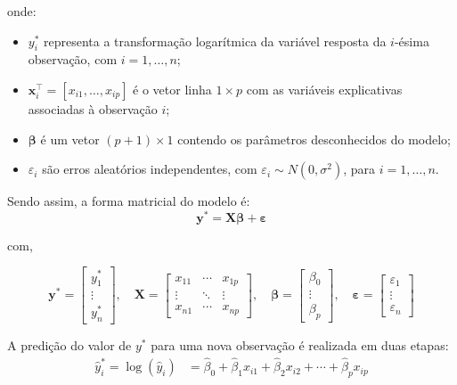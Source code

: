 \documentclass[12pt,a4paper,header]{abnt}
\begin{document}
onde:

\begin{itemize}
    \item \( y_i^* \) representa a transformação logarítmica da variável resposta da \(i\)-ésima observação, com $i = 1,\ldots,n$;
    \item \( \mathbf{x}_i^\top = [x_{i1}, \ldots, x_{ip}] \) é o vetor linha \( 1 \times p \) com as variáveis explicativas associadas à observação \(i\);
    \item \( \boldsymbol{\beta} \) é um vetor \( (p+1) \times 1 \) contendo os parâmetros desconhecidos do modelo;
    \item \(\varepsilon_i\) são erros aleatórios independentes, com \( \varepsilon_i \sim N(0, \sigma^2) \), para $i = 1,\ldots,n$.
\end{itemize}

Sendo assim, a forma matricial do modelo é:
\begin{equation}
\mathbf{y}^* = \mathbf{X} \boldsymbol{\beta} + \boldsymbol{\varepsilon}
\label{eq:lognormal_model2}
\end{equation}

com,

\[
\mathbf{y}^* =
\begin{bmatrix}
y_{1}^* \\
\vdots \\
y_{n}^*
\end{bmatrix}, \quad
\mathbf{X} =
\begin{bmatrix}
x_{11} & \cdots & x_{1p} \\
\vdots & \ddots & \vdots \\
x_{n1} & \cdots & x_{np}
\end{bmatrix}, \quad
\boldsymbol{\beta} =
\begin{bmatrix}
\beta_0 \\
\vdots \\
\beta_p
\end{bmatrix}, \quad
\boldsymbol{\varepsilon} =
\begin{bmatrix}
\varepsilon_1 \\
\vdots \\
\varepsilon_n
\end{bmatrix}
\]

A predição do valor de \(y^*\) para uma nova observação é realizada em duas etapas:
\begin{align}
 \hat{y}_i^* = \log(\hat{y}_i) &= \hat{\beta}_0 + \hat{\beta}_1 x_{i1} + \hat{\beta}_2 x_{i2} + \cdots + \hat{\beta}_p x_{ip}
\label{eq:log_pred}
\end{align}
\end{document}
